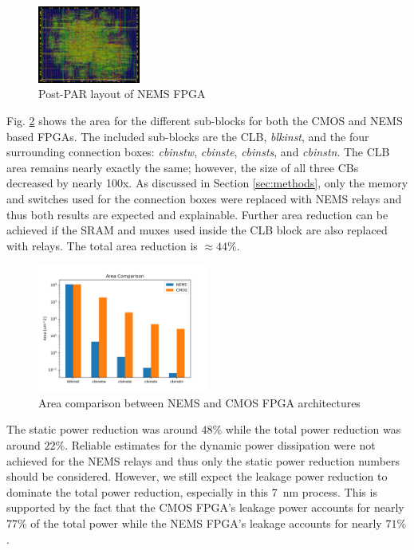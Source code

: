 \documentclass[twoside,twocolumn]{article}
\begin{document}
\begin{figure}[!hbt]
    \centering
    \caption{Post-PAR layout of NEMS FPGA}
    \label{fig:nems}
    \includegraphics[width=0.3\textwidth]{figs/cmos_innovus.png}
\end{figure}

Fig. \ref{fig:area} shows the area for the different sub-blocks
for both the CMOS and NEMS based FPGAs. The included sub-blocks are the CLB,
\textit{blkinst}, and the four surrounding connection boxes: \textit{cbinstw}, 
\textit{cbinste}, \textit{cbinsts}, and \textit{cbinstn}. The CLB area remains 
nearly exactly the same; however, the size of all three CBs decreased by nearly 
100x. As discussed in Section \ref{sec:methods}, only the memory and switches
used for the connection boxes were replaced with NEMS relays and thus both 
results are expected and explainable. Further area reduction can be achieved
if the SRAM and muxes used inside the CLB block are also replaced with relays.
The total area reduction is $\approx 44\%$. 

\begin{figure}[!hbt]
    \centering
    \caption{Area comparison between NEMS and CMOS FPGA architectures}
    \label{fig:area}
    \includegraphics[width=0.5\textwidth]{figs/area_comparison.png}
\end{figure}

The static power reduction was around $48\%$ while the total power reduction
was around $22\%$. Reliable estimates for the dynamic power dissipation were 
not achieved for the NEMS relays and thus only the static power reduction numbers 
should be considered. However, we still expect the leakage power reduction to dominate 
the total power reduction, especially in this \SI{7}{\nano\meter} process. This is
supported by the fact that the CMOS FPGA's leakage power accounts for nearly $77\%$ 
of the total power while the NEMS FPGA's leakage accounts for nearly $71\%$.
\end{document}
